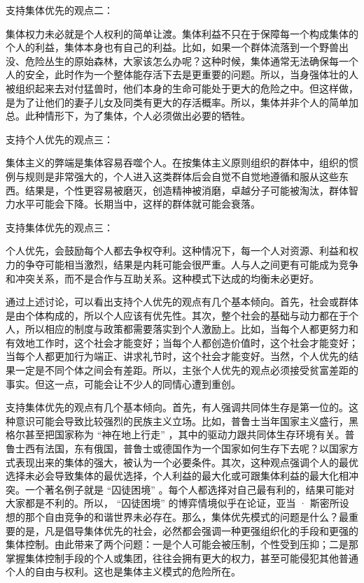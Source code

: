 支持集体优先的观点二：

集体权力未必就是个人权利的简单让渡。集体利益不只在于保障每一个构成集体的个人的利益，集体本身也有自己的利益。比如，如果一个群体流落到一个野兽出没、危险丛生的原始森林，大家该怎么办呢？这种时候，集体通常无法确保每一个人的安全，此时作为一个整体能存活下去是更重要的问题。所以，当身强体壮的人被组织起来去对付猛兽时，他们本身的生命可能处于更大的危险之中。但这样做，是为了让他们的妻子儿女及同类有更大的存活概率。所以，集体并非个人的简单加总。此种情形下，为了集体，个人必须做出必要的牺牲。

支持个人优先的观点三：

集体主义的弊端是集体容易吞噬个人。在按集体主义原则组织的群体中，组织的惯例与规则是非常强大的，个人进入这类群体后会自觉不自觉地遵循和服从这些东西。结果是，个性更容易被磨灭，创造精神被消磨，卓越分子可能被淘汰，群体智力水平可能会下降。长期当中，这样的群体就可能会衰落。

支持集体优先的观点三：

个人优先，会鼓励每个人都去争权夺利。这种情况下，每一个人对资源、利益和权力的争夺可能相当激烈，结果是内耗可能会很严重。人与人之间更有可能成为竞争和冲突关系，而不是合作与互助关系。这种模式下达成的均衡未必更好。

通过上述讨论，可以看出支持个人优先的观点有几个基本倾向。首先，社会或群体是由个体构成的，所以个人应该有优先性。其次，整个社会的基础与动力都在于个人，所以相应的制度与政策都需要落实到个人激励上。比如，当每个人都更努力和有效地工作时，这个社会才能变好；当每个人都创造价值时，这个社会才能变好；当每个人都更加行为端正、讲求礼节时，这个社会才能变好。当然，个人优先的结果一定是不同个体之间会有差距。所以，主张个人优先的观点必须接受贫富差距的事实。但这一点，可能会让不少人的同情心遭到重创。

支持集体优先的观点有几个基本倾向。首先，有人强调共同体生存是第一位的。这种意识可能会导致比较强烈的民族主义立场。比如，普鲁士当年国家主义盛行，黑格尔甚至把国家称为 “神在地上行走” ，其中的驱动力跟共同体生存环境有关。普鲁士西有法国，东有俄国，普鲁士或德国作为一个国家如何生存下去呢？以国家方式表现出来的集体的强大，被认为一个必要条件。其次，这种观点强调个人的最优选择未必会导致集体的最优选择，个人利益的最大化或可跟集体利益的最大化相冲突。一个著名例子就是 “囚徒困境” 。每个人都选择对自己最有利的，结果可能对大家都是不利的。所以， “囚徒困境” 的博弈情境似乎在论证，亚当 · 斯密所设想的那个自由竞争的和谐世界未必存在。那么，集体优先模式的问题是什么？最重要的是，凡是倡导集体优先的社会，必然都会强调一种更强组织化的手段和更强的集体控制。由此带来了两个问题：一是个人可能会被压制，个性受到压抑；二是那掌握集体控制手段的个人或集团，往往会拥有更大的权力，甚至可能侵犯其他普通个人的自由与权利。这也是集体主义模式的危险所在。

